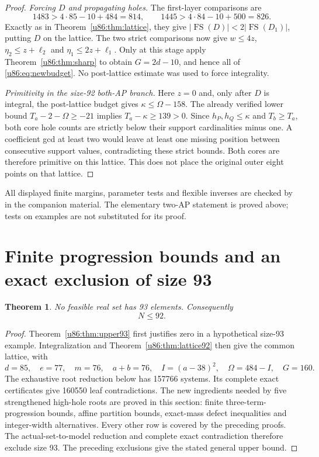 \documentclass[11pt,a4paper]{article}
\newtheorem{theorem}{Theorem}[section]
\theoremstyle{remark}
\newcommand{\FS}{\operatorname{FS}}
\begin{document}
\begin{proof}
\emph{Forcing $D$ and propagating holes.}
The first-layer comparisons are
\[
 1483>4\cdot85-10+484=814,\qquad
 1445>4\cdot84-10+500=826.
\]
Exactly as in Theorem~\ref{u86:thm:lattice}, they give
$|\FS(D)|<2|\FS(D_1)|$, putting $D$ on the lattice. The two strict
comparisons now give $w\le4z$, $\eta_2\le z+\ell_2$ and
$\eta_1\le2z+\ell_1$. Only at this stage apply
Theorem~\ref{u86:thm:sharp} to obtain $G=2d-10$, and hence all of
\eqref{u86:eq:newbudget}. No post-lattice estimate was used to force
integrality.

\emph{Primitivity in the size-92 both-AP branch.}
Here $z=0$ and, only after $D$ is integral, the post-lattice budget gives
$\kappa\le\Omega-158$. The already verified lower bound
$T_a-2-\Omega\ge-21$ implies $T_a-\kappa\ge139>0$.
Since $h_P,h_Q\le\kappa$ and $T_b\ge T_a$, both core hole counts are
strictly below their support cardinalities minus one. A coefficient gcd
at least two would leave at least one missing position between consecutive
support values, contradicting these strict bounds. Both cores are therefore
primitive on this lattice. This does not place the original outer eight
points on that lattice.
\end{proof}
All displayed finite margins, parameter tests and flexible inverses are
checked by  in the companion
material. The elementary two-AP statement is proved above; tests on
examples are not substituted for its proof.

\section{Finite progression bounds and an exact exclusion of size 93}\label{u86:sec:upper92}
\begin{theorem}\label{u86:thm:upper92}
No feasible real set has 93 elements. Consequently
\[
 \boxed{N\le92.}
\]
\end{theorem}
\begin{proof}
Theorem~\ref{u86:thm:upper93} first justifies zero in a hypothetical size-93
example. Integralization and Theorem~\ref{u86:thm:lattice92} then give the
common lattice, with
\[
 d=85,\quad e=77,\quad m=76,\quad a+b=76,\quad
 I=(a-38)^2,\quad\Omega=484-I,\quad G=160.
\]
The exhaustive root reduction below has 157766 systems. Its complete
exact certificates give 160550 leaf contradictions. The new ingredients
needed by five strengthened high-hole roots are proved in this section:
finite three-term-progression bounds, affine partition bounds, exact-mass
defect inequalities and integer-width alternatives. Every other row is
covered by the preceding proofs. The actual-set-to-model reduction and
complete exact contradiction therefore exclude size 93.
The preceding exclusions give the stated general upper bound.
\end{proof}
\end{document}
